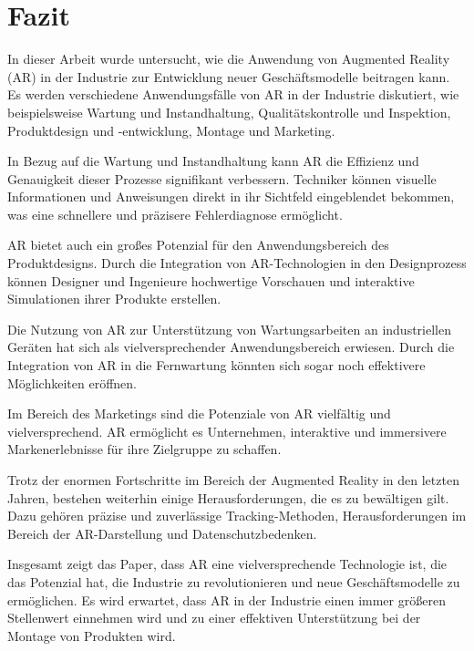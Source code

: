\section{Fazit}

In dieser Arbeit wurde untersucht, wie die Anwendung von Augmented Reality (AR)
in der Industrie zur Entwicklung neuer Geschäftsmodelle beitragen kann. Es
werden verschiedene Anwendungsfälle von AR in der Industrie diskutiert, wie
beispielsweise Wartung und Instandhaltung, Qualitätskontrolle und Inspektion,
Produktdesign und -entwicklung, Montage und Marketing.

In Bezug auf die Wartung und Instandhaltung kann AR die Effizienz und
Genauigkeit dieser Prozesse signifikant verbessern. Techniker können visuelle
Informationen und Anweisungen direkt in ihr Sichtfeld eingeblendet bekommen,
was eine schnellere und präzisere Fehlerdiagnose ermöglicht.

AR bietet auch ein großes Potenzial für den Anwendungsbereich des
Produktdesigns. Durch die Integration von AR-Technologien in den Designprozess
können Designer und Ingenieure hochwertige Vorschauen und interaktive
Simulationen ihrer Produkte erstellen.

Die Nutzung von AR zur Unterstützung von Wartungsarbeiten an industriellen
Geräten hat sich als vielversprechender Anwendungsbereich erwiesen. Durch die
Integration von AR in die Fernwartung könnten sich sogar noch effektivere
Möglichkeiten eröffnen.

Im Bereich des Marketings sind die Potenziale von AR vielfältig und
vielversprechend. AR ermöglicht es Unternehmen, interaktive und immersivere
Markenerlebnisse für ihre Zielgruppe zu schaffen.

Trotz der enormen Fortschritte im Bereich der Augmented Reality in den letzten
Jahren, bestehen weiterhin einige Herausforderungen, die es zu bewältigen gilt.
Dazu gehören präzise und zuverlässige Tracking-Methoden, Herausforderungen im
Bereich der AR-Darstellung und Datenschutzbedenken.

Insgesamt zeigt das Paper, dass AR eine vielversprechende Technologie ist, die
das Potenzial hat, die Industrie zu revolutionieren und neue Geschäftsmodelle
zu ermöglichen. Es wird erwartet, dass AR in der Industrie einen immer größeren
Stellenwert einnehmen wird und zu einer effektiven Unterstützung bei der
Montage von Produkten wird.